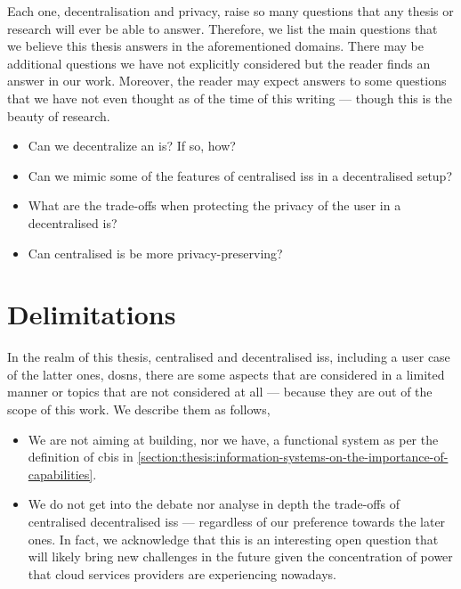 \documentclass[showtrims, oldfontcommands]{kthesis}
\begin{document}
Each one, decentralisation and privacy, raise so many questions that any thesis 
or research will ever be able to answer. Therefore, we list the main questions that 
we believe this thesis answers in the aforementioned domains. There may be additional 
questions we have not explicitly considered but the reader finds an answer in our 
work. Moreover, the reader may expect answers to some questions that we have not 
even thought as of the time of this writing --- though this is the beauty of research.

\begin{itemize}
    \item Can we decentralize an \ac{is}? If so, how?\\
    \item Can we mimic some of the features of centralised \acp{is} in a decentralised setup?\\
    \item What are the trade-offs when protecting the privacy of the user in a decentralised \ac{is}?\\
    \item Can centralised \ac{is} be more privacy-preserving?\\
\end{itemize}

\section{Delimitations}
    \label{section:delimitations}
In the realm of this thesis, centralised and decentralised \acp{is}, including a 
user case of the latter ones, \acp{dosn}, there are some aspects that are considered 
in a limited manner or topics that are not considered at all --- because they are 
out of the scope of this work. We describe them as follows,

\begin{itemize}
    \item We are not aiming at building, nor we have, a functional system as per 
    the definition of \ac{cbis} in \cref{section:thesis:information-systems-on-the-importance-of-capabilities}.

    \item We do not get into the debate nor analyse in depth the trade-offs of centralised 
    \vs decentralised \acp{is} --- regardless of our preference towards the later 
    ones. In fact, we acknowledge that this is an interesting open question that 
    will likely bring new challenges in the future given the concentration of power 
    that cloud services providers are experiencing nowadays.
\end{itemize}
\end{document}
